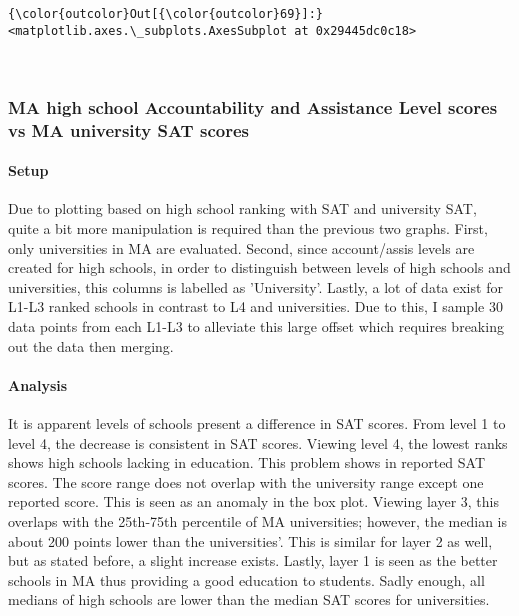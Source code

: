 \documentclass[11pt]{article}
\begin{document}
\begin{Verbatim}[commandchars=\\\{\}]
{\color{outcolor}Out[{\color{outcolor}69}]:} <matplotlib.axes.\_subplots.AxesSubplot at 0x29445dc0c18>
\end{Verbatim}
            
    \begin{center}
    \end{center}
    { \hspace*{\fill} \\}
    
    \subsubsection{MA high school Accountability and Assistance Level scores
vs MA university SAT
scores}\label{ma-high-school-accountability-and-assistance-level-scores-vs-ma-university-sat-scores}

\paragraph{Setup}\label{setup}

Due to plotting based on high school ranking with SAT and university
SAT, quite a bit more manipulation is required than the previous two
graphs. First, only universities in MA are evaluated. Second, since
account/assis levels are created for high schools, in order to
distinguish between levels of high schools and universities, this
columns is labelled as 'University'. Lastly, a lot of data exist for
L1-L3 ranked schools in contrast to L4 and universities. Due to this, I
sample 30 data points from each L1-L3 to alleviate this large offset
which requires breaking out the data then merging.

\paragraph{Analysis}\label{analysis}

It is apparent levels of schools present a difference in SAT scores.
From level 1 to level 4, the decrease is consistent in SAT scores.
Viewing level 4, the lowest ranks shows high schools lacking in
education. This problem shows in reported SAT scores. The score range
does not overlap with the university range except one reported score.
This is seen as an anomaly in the box plot. Viewing layer 3, this
overlaps with the 25th-75th percentile of MA universities; however, the
median is about 200 points lower than the universities'. This is similar
for layer 2 as well, but as stated before, a slight increase exists.
Lastly, layer 1 is seen as the better schools in MA thus providing a
good education to students. Sadly enough, all medians of high schools
are lower than the median SAT scores for universities.
\end{document}
